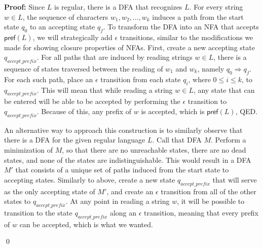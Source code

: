 \documentclass[12pt,letterpaper,final]{report}
\begin{document}
{\bf Proof:} Since $L$ is regular, there is a DFA that recognizes $L$. For every string $w \in L$, the sequence of characters $w_1, w_2, \ldots, w_k$ induces a path from the start state $q_0$ to an accepting state $q_f$. To transform the DFA into an NFA that accepts $\mathsf{pref}(L)$, we will strategically add $\epsilon$ transitions, similar to the modifications we made for showing closure properties of NFAs. First, create a new accepting state $q_{accept\_prefix}$. For all paths that are induced by reading strings $w \in L$, there is a sequence of states traversed between the reading of $w_1$ and $w_k$, namely $q_0 \Rightarrow q_f$. For each such path, place an $\epsilon$ transition from each state $q_i$, where $0 \le i \le k$, to $q_{accept\_prefix}$. This will mean that while reading a string $w \in L$, any state that can be entered will be able to be accepted by performing the $\epsilon$ transition to $q_{accept\_prefix}$. Because of this, any prefix of $w$ is accepted, which is $\mathsf{pref}(L)$, QED.

An alternative way to approach this construction is to similarly observe that there is a DFA for the given regular language $L$. Call that DFA $M$. Perform a minimization of $M$, so that there are no unreachable states, there are no dead states, and none of the states are indistinguishable. This would result in a DFA $M'$ that consists of a unique set of paths induced from the start state to accepting states. Similarly to above, create a new state $q_{accept\_prefix}$ that will serve as the only accepting state of $M'$, and create an $\epsilon$ transition from all of the other states to $q_{accept\_prefix}$. At any point in reading a string $w$, it will be possible to transition to the state $q_{accept\_prefix}$ along an $\epsilon$ transition, meaning that every prefix of $w$ can be accepted, which is what we wanted.

\qed
\end{document}
